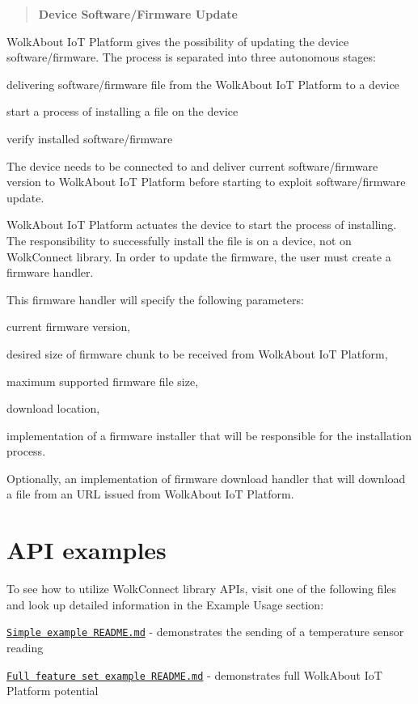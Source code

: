 \label{_dfu}%
 \begin{quote}
{\bfseries Device Software/\+Firmware Update} \end{quote}
Wolk\+About IoT Platform gives the possibility of updating the device software/firmware. The process is separated into three autonomous stages\+:


\begin{DoxyItemize}
\item delivering software/firmware file from the Wolk\+About IoT Platform to a device
\item start a process of installing a file on the device
\item verify installed software/firmware
\end{DoxyItemize}

The device needs to be connected to and deliver current software/firmware version to Wolk\+About IoT Platform before starting to exploit software/firmware update.

Wolk\+About IoT Platform actuates the device to start the process of installing. The responsibility to successfully install the file is on a device, not on Wolk\+Connect library. In order to update the firmware, the user must create a firmware handler.

This firmware handler will specify the following parameters\+:


\begin{DoxyItemize}
\item current firmware version,
\item desired size of firmware chunk to be received from Wolk\+About IoT Platform,
\item maximum supported firmware file size,
\item download location,
\item implementation of a firmware installer that will be responsible for the installation process.
\item Optionally, an implementation of firmware download handler that will download a file from an U\+RL issued from Wolk\+About IoT Platform.
\end{DoxyItemize}



 \section*{A\+PI examples}



 To see how to utilize Wolk\+Connect library A\+P\+Is, visit one of the following files and look up detailed information in the Example Usage section\+:


\begin{DoxyItemize}
\item \href{md_README.html}{\tt Simple example R\+E\+A\+D\+M\+E.\+md} -\/ demonstrates the sending of a temperature sensor reading
\item \href{md_examples_full_feature_set_README.html}{\tt Full feature set example R\+E\+A\+D\+M\+E.\+md} -\/ demonstrates full Wolk\+About IoT Platform potential 
\end{DoxyItemize}